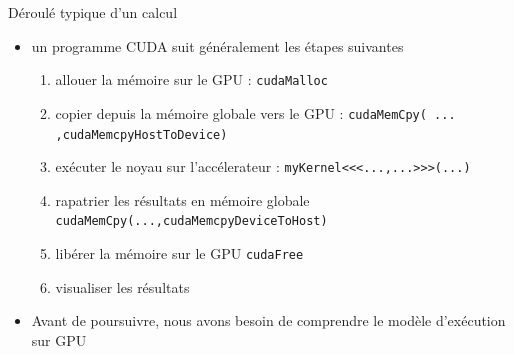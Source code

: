 \documentclass[11pt,mathserif]{beamer}
\begin{document}
\begin{frame}{Déroulé typique d'un calcul}
  \lstset{basicstyle=\ttfamily}
\pause
  \begin{itemize}[<+->]
  \item un programme CUDA suit généralement les étapes suivantes 
\begin{enumerate}[<+->]
 \item allouer la mémoire sur le GPU : \lstinline!cudaMalloc!
 \item copier depuis la mémoire globale vers le GPU : \lstinline!cudaMemCpy( ... ,cudaMemcpyHostToDevice)!
 \item exécuter le noyau sur l'accélerateur : \lstinline!myKernel<<<...,...>>>(...)!
 \item rapatrier les résultats en mémoire globale \lstinline!cudaMemCpy(...,cudaMemcpyDeviceToHost)!
 \item libérer la mémoire sur le GPU \lstinline!cudaFree!
 \item visualiser les résultats
\end{enumerate}
\item Avant de poursuivre, nous avons besoin de comprendre le modèle d'exécution sur GPU
\end{itemize}
\end{frame}
\end{document}
